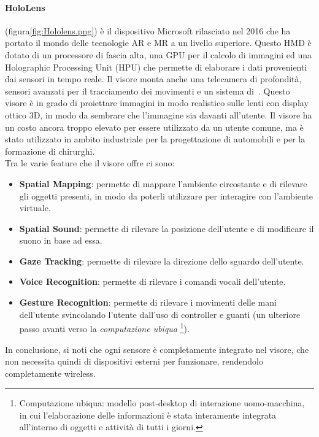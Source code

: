         \paragraph{HoloLens} (figura\ref{fig:Hololens.png}) è il dispositivo Microsoft rilasciato nel 2016 che ha portato il mondo delle tecnologie 
            AR e MR a un livello superiore. Questo HMD è dotato di un processore di fascia alta, una GPU per il calcolo
            di immagini ed una Holographic Processing Unit (HPU) che permette di elaborare i dati provenienti dai sensori
            in tempo reale. Il visore monta anche una telecamera di profondità, sensori avanzati per il tracciamento dei
            movimenti e un sistema di~\cite{HoloLens}. Questo visore è in grado di proiettare immagini in modo
            realistico sulle lenti con display ottico 3D, in modo da sembrare che l'immagine sia davanti all'utente.
            Il visore ha un costo ancora troppo elevato per essere utilizzato da un utente comune, ma è stato utilizzato
            in ambito industriale per la progettazione di automobili e per la formazione di chirurghi. \\
            Tra le varie feature che il visore offre ci sono:
            \begin{itemize}
                \item \textbf{Spatial Mapping}: permette di mappare l'ambiente circostante e di rilevare gli oggetti
                    presenti, in modo da poterli utilizzare per interagire con l'ambiente virtuale.
                \item \textbf{Spatial Sound}: permette di rilevare la posizione dell'utente e di modificare il suono in base
                    ad essa.
                \item \textbf{Gaze Tracking}: permette di rilevare la direzione dello sguardo dell'utente.
                \item \textbf{Voice Recognition}: permette di rilevare i comandi vocali dell'utente.
                \item \textbf{Gesture Recognition}: permette di rilevare i movimenti delle mani dell'utente svincolando
                    l'utente dall'uso di controller e guanti (un ulteriore passo avanti verso la \textit{computazione ubiqua}
                    \footnote{Computazione ubiqua: modello post-desktop di interazione uomo-macchina, in cui l'elaborazione
                    delle informazioni è stata interamente integrata all'interno di oggetti e attività di tutti i giorni.\cite{ubiCompWiki}}).
            \end{itemize}
            In conclusione, si noti che ogni sensore è completamente integrato nel visore, che non necessita quindi di
            dispositivi esterni per funzionare, rendendolo completamente wireless.

